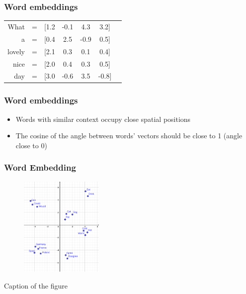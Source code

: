 \begin{frame}
\frametitle{Word embeddings}

\begin{table}[h]
	\hspace{15mm}
	\huge
	\begin{tabular}{rcccccc}
		What & = & [1.2 & -0.1 & 4.3 & 3.2] \\
		a & = & [0.4 & 2.5 & -0.9 & 0.5] \\
		lovely & = & [2.1 & 0.3 & 0.1& 0.4] \\
		nice & = & [2.0& 0.4& 0.3& 0.5] \\
		day & = & [3.0& -0.6& 3.5& -0.8] \\
	\end{tabular}
\end{table}



\end{frame}

\begin{frame}
\frametitle{Word embeddings}

	\begin{itemize}
		\item Words with similar context occupy close spatial positions
		\item The cosine of the angle between words' vectors should be close to 1 (angle close to 0)
	\end{itemize}

\end{frame}

\begin{frame}
	\frametitle{Word Embedding}

	\begin{figure}
		\includegraphics[width=4cm]{./figures/Groups}

	\end{figure}
		\begin{center}
		{Caption of the figure}
		\end{center}
	\vspace{-0.5cm}



\end{frame}

